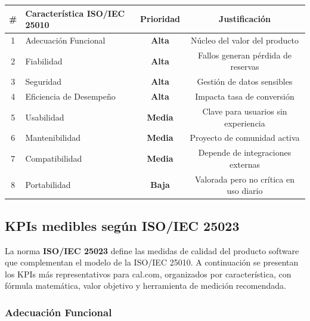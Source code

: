 \documentclass[12pt, a4paper]{article}
\begin{document}
\begin{center}
\begin{tabular}{clcc}
\toprule
\textbf{\#} & \textbf{Característica ISO/IEC 25010} & \textbf{Prioridad} & \textbf{Justificación} \\
\midrule
1 & Adecuación Funcional   & \textbf{Alta}  & Núcleo del valor del producto \\
2 & Fiabilidad             & \textbf{Alta}  & Fallos generan pérdida de reservas \\
3 & Seguridad              & \textbf{Alta}  & Gestión de datos sensibles \\
4 & Eficiencia de Desempeño & \textbf{Alta} & Impacta tasa de conversión \\
5 & Usabilidad             & \textbf{Media} & Clave para usuarios sin experiencia \\
6 & Mantenibilidad         & \textbf{Media} & Proyecto de comunidad activa \\
7 & Compatibilidad         & \textbf{Media} & Depende de integraciones externas \\
8 & Portabilidad           & \textbf{Baja}  & Valorada pero no crítica en uso diario \\
\bottomrule
\end{tabular}
\end{center}

\subsection{KPIs medibles según ISO/IEC 25023}

La norma \textbf{ISO/IEC 25023} define las medidas de calidad del producto software que
complementan el modelo de la ISO/IEC 25010. A continuación se presentan los KPIs más
representativos para cal.com, organizados por característica, con fórmula matemática,
valor objetivo y herramienta de medición recomendada.

\subsubsection*{Adecuación Funcional}
\end{document}
